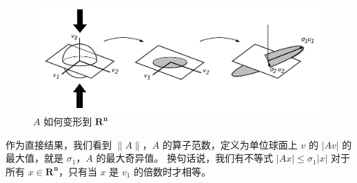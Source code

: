 \documentclass[11pt,a4paper,twoside]{article}
\begin{document}
\begin{CJK}{UTF8}{gbsn}
\begin{figure}[htbp]%
  \centering
  \includegraphics[totalheight=2.5in]{./fig/2.jpg}
  \caption{$A$ 如何变形到 $\mathbf{R}^{\mathbf{n}}$} 
  \label{fig:2}
\end{figure}

作为直接结果，我们看到 $\|A\|$，$A$ 的算子范数，定义为单位球面上 $v$ 的 $|A v|$ 的最大值，就是 $\sigma_ {1}$，$A$ 的最大奇异值。 换句话说，我们有不等式 $|A x| \leq \sigma_{1}|x|$ 对于所有 $x \in \mathbf{R}^{\mathbf{n}}$，只有当 $x$ 是 $v_{1}$ 的倍数时才相等。


\end{CJK}
\end{document}
